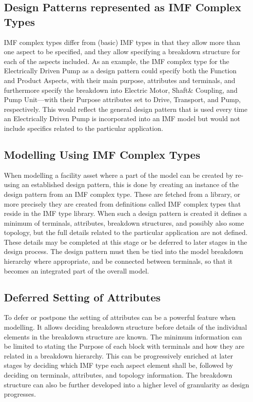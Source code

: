 \documentclass[../main.tex]{subfiles}
\begin{document}
\subsection{Design Patterns represented as IMF Complex Types}
IMF complex types differ from (basic) IMF types in that they allow more than one aspect to be
specified, and they allow specifying a breakdown structure for each of the aspects included.  As an example, the IMF
complex type for the Electrically Driven Pump as a design pattern could specify both the Function and Product
Aspects, with their main purpose, attributes and terminals, and furthermore specify the breakdown into Electric Motor,
Shaft\& Coupling, and Pump Unit---with their Purpose attributes set to Drive, Transport, and Pump, respectively. This would reflect
the general design pattern that is used every time an Electrically Driven Pump is incorporated into an IMF model
but would not include specifics related to the particular application.

\subsection{Modelling Using IMF Complex Types}
When modelling a facility asset where a part of the model can be created by re-using an
established design pattern, this is done by creating an instance of the design pattern from an IMF
complex type. These are fetched from a library, or more precisely they are created from definitions called IMF
complex types that reside in the IMF type library. When such a design pattern is created it defines a minimum of
terminals, attributes, breakdown structures, and possibly also some topology, but the full details related to the
particular application are not defined. These details may be completed at this stage or be deferred to later stages
in the design process. The design pattern must then be tied into the model breakdown hierarchy where appropriate, and
be connected between terminals, so that it becomes an integrated part of the overall model.

\subsection{Deferred Setting of Attributes}
To defer or postpone the setting of attributes can be a powerful feature when modelling.
It allows deciding breakdown structure before details of the individual elements in the breakdown structure are
known. The minimum information can be limited to stating the Purpose of each block with terminals and how they are related
in a breakdown hierarchy. This can be progressively enriched at later stages by deciding which IMF type each aspect
element shall be, followed by deciding on terminals, attributes, and topology information.  The breakdown structure
can also be further developed into a higher level of granularity as design progresses.
\end{document}
